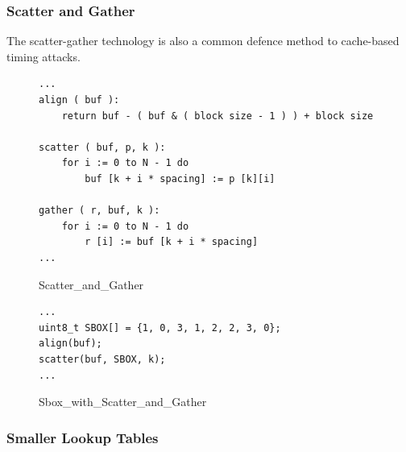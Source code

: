 \subsubsection{Scatter and Gather}
The scatter-gather technology is also a common defence method to cache-based timing attacks.
\begin{figure}[h!]
    \centering
\begin{lstlisting}[xleftmargin=.02\textwidth,xrightmargin=.01\textwidth]
...
align ( buf ):
    return buf - ( buf & ( block size - 1 ) ) + block size

scatter ( buf, p, k ):
    for i := 0 to N - 1 do
        buf [k + i * spacing] := p [k][i]

gather ( r, buf, k ):
    for i := 0 to N - 1 do
        r [i] := buf [k + i * spacing]
...
\end{lstlisting}
\caption{Scatter\_and\_Gather}
\label{Scatter_and_Gather}
\end{figure}

\begin{figure}[h!]
    \centering
\begin{lstlisting}[xleftmargin=.02\textwidth,xrightmargin=.01\textwidth]
...
uint8_t SBOX[] = {1, 0, 3, 1, 2, 2, 3, 0};
align(buf);
scatter(buf, SBOX, k);
...
\end{lstlisting}
\caption{Sbox\_with\_Scatter\_and\_Gather}
\label{SBOX_sg}
\end{figure}

\subsubsection{Smaller Lookup Tables}
